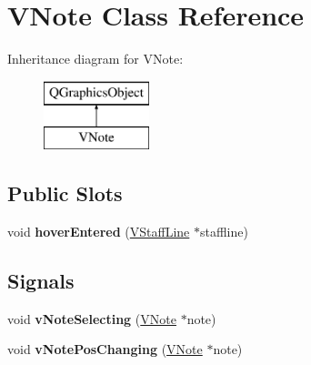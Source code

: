 \hypertarget{class_v_note}{}\section{V\+Note Class Reference}
\label{class_v_note}
Inheritance diagram for V\+Note\+:\begin{figure}[H]
\begin{center}
\leavevmode
\includegraphics[height=2.000000cm]{class_v_note}
\end{center}
\end{figure}
\subsection*{Public Slots}
\begin{DoxyCompactItemize}
\item 
\hypertarget{class_v_note_af25595b327a49fd2ee53332634f5480d}{}void {\bfseries hover\+Entered} (\hyperlink{class_v_staff_line}{V\+Staff\+Line} $\ast$staffline)\label{class_v_note_af25595b327a49fd2ee53332634f5480d}

\end{DoxyCompactItemize}
\subsection*{Signals}
\begin{DoxyCompactItemize}
\item 
\hypertarget{class_v_note_a3f78010b5f01c260cd8b317fb6e57ec1}{}void {\bfseries v\+Note\+Selecting} (\hyperlink{class_v_note}{V\+Note} $\ast$note)\label{class_v_note_a3f78010b5f01c260cd8b317fb6e57ec1}

\item 
\hypertarget{class_v_note_a9ecb1c67b0c0c61afd07c11f642819e6}{}void {\bfseries v\+Note\+Pos\+Changing} (\hyperlink{class_v_note}{V\+Note} $\ast$note)\label{class_v_note_a9ecb1c67b0c0c61afd07c11f642819e6}

\end{DoxyCompactItemize}
